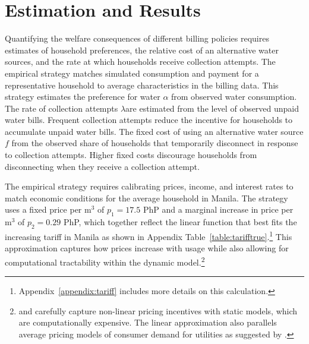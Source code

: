 \documentclass[12pt]{article}
\begin{document}
\section{Estimation and Results}\label{section:estimation}    %



Quantifying the welfare consequences of different billing policies requires estimates of household preferences, the relative cost of an alternative water sources, and the rate at which households receive collection attempts.  The empirical strategy matches simulated consumption and payment for a representative household to average characteristics in the billing data.  This strategy estimates the preference for water $\alpha$ from observed water consumption.  The rate of collection attempts $\lambda$are estimated from the level of observed unpaid water bills.  Frequent collection attempts reduce the incentive for households to accumulate unpaid water bills.  The fixed cost of using an alternative water source $f$ from the observed share of households that temporarily disconnect in response to collection attempts.  Higher fixed costs discourage households from disconnecting when they receive a collection attempt.

The empirical strategy requires calibrating prices, income, and interest rates to match economic conditions for the average household in Manila.  The strategy uses a fixed price per $\text{m}^{3}$ of $p_1=17.5$ PhP and a marginal increase in price per $\text{m}^{3}$ of $p_2=0.29$ PhP, which together reflect the linear function that best fits the increasing tariff in Manila as shown in Appendix Table~\ref{table:tarifftrue}.\footnote{Appendix~\ref{appendix:tariff} includes more details on this calculation. }  This approximation captures how prices increase with usage while also allowing for computational tractability within the dynamic model.\footnote{\cite{wjv} and \cite{szabo2015value} carefully capture non-linear pricing incentives with static models, which are computationally expensive.  The linear approximation also parallels average pricing models of consumer demand for utilities as suggested by \cite{ito2014consumers}.}  
\end{document}
